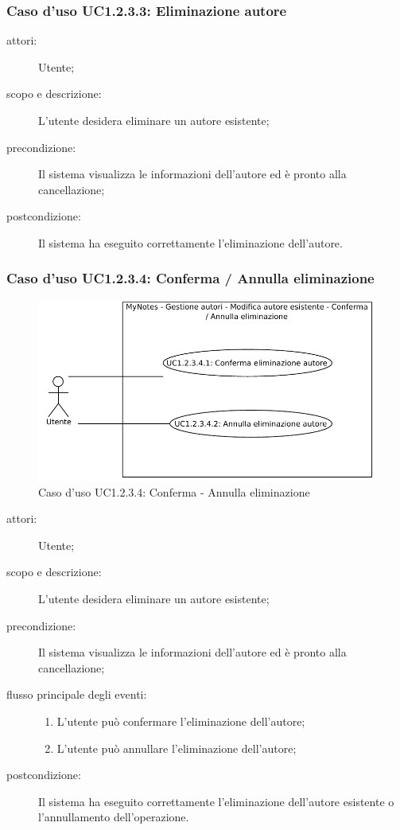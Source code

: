 \subsubsection{Caso d'uso UC1.2.3.3: Eliminazione autore}
\begin{description}
\item[attori:] Utente;
\item[scopo e descrizione:] L'utente desidera eliminare un autore esistente;
\item[precondizione:] Il sistema visualizza le informazioni dell'autore ed è pronto alla cancellazione;
\item[postcondizione:] Il sistema ha eseguito correttamente l'eliminazione dell'autore.
\end{description}

\subsubsection{Caso d'uso UC1.2.3.4: Conferma / Annulla eliminazione}
\begin{figure}[htb]
\centering
\includegraphics[scale=0.6]{gfx/useCase/MN_UC1-2-3-4_Conferma-Annulla_eliminazione.pdf}
\caption{Caso d'uso UC1.2.3.4: Conferma - Annulla eliminazione}
\label{fig:My notes UC1.2.3.4}
\end{figure}

\begin{description}
\item[attori:] Utente;
\item[scopo e descrizione:] L'utente desidera eliminare un autore esistente;
\item[precondizione:] Il sistema visualizza le informazioni dell'autore ed è pronto alla cancellazione;
\item[flusso principale degli eventi:] \hfill
	\begin{enumerate}
	\item L'utente può confermare l'eliminazione dell'autore;
	\item L'utente può annullare l'eliminazione dell'autore;
	\end{enumerate}
\item[postcondizione:] Il sistema ha eseguito correttamente l'eliminazione dell'autore esistente o l'annullamento dell'operazione.
\end{description}

